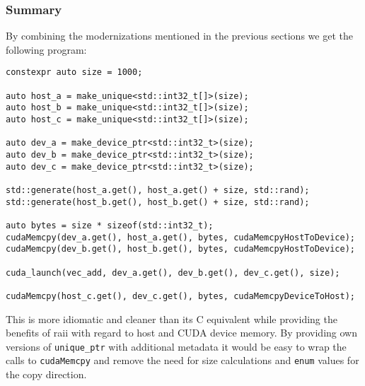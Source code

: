 \subsubsection{Summary}\label{modern:vec_add:summary}

By combining the modernizations mentioned in the previous sections we get the following program:

\begin{verbatim}
constexpr auto size = 1000;

auto host_a = make_unique<std::int32_t[]>(size);
auto host_b = make_unique<std::int32_t[]>(size);
auto host_c = make_unique<std::int32_t[]>(size);

auto dev_a = make_device_ptr<std::int32_t>(size);
auto dev_b = make_device_ptr<std::int32_t>(size);
auto dev_c = make_device_ptr<std::int32_t>(size);

std::generate(host_a.get(), host_a.get() + size, std::rand);
std::generate(host_b.get(), host_b.get() + size, std::rand);

auto bytes = size * sizeof(std::int32_t);
cudaMemcpy(dev_a.get(), host_a.get(), bytes, cudaMemcpyHostToDevice);
cudaMemcpy(dev_b.get(), host_b.get(), bytes, cudaMemcpyHostToDevice);

cuda_launch(vec_add, dev_a.get(), dev_b.get(), dev_c.get(), size);

cudaMemcpy(host_c.get(), dev_c.get(), bytes, cudaMemcpyDeviceToHost);
\end{verbatim}

\noindent This is more idiomatic and cleaner than its C equivalent while providing the benefits of \gls{raii} with regard to host and CUDA device memory. By providing own versions of \texttt{unique\_ptr} with additional metadata it would be easy to wrap the calls to \texttt{cudaMemcpy} and remove the need for size calculations and \texttt{enum} values for the copy direction.